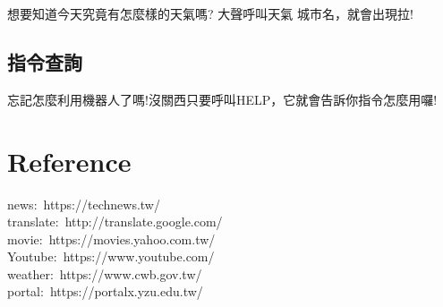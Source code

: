 \documentclass{scrreprt}
\begin{document}
\begin{CJK}{UTF8}{bkai}
想要知道今天究竟有怎麼樣的天氣嗎? 大聲呼叫{\color{red}天氣 城市名}，就會出現拉!

\section{指令查詢}

忘記怎麼利用機器人了嗎!沒關西只要呼叫{\color{red}HELP}，它就會告訴你指令怎麼用囉!

\chapter{Reference}

news$:$ {\color{blue}https://technews.tw/}\\
translate$:$ {\color{blue}http://translate.google.com/}\\
movie$:$ {\color{blue}https://movies.yahoo.com.tw/}\\
Youtube$:$ {\color{blue}https://www.youtube.com/}\\
weather$:$ {\color{blue}https://www.cwb.gov.tw/}\\
portal$:$ {\color{blue}https://portalx.yzu.edu.tw/}

\end{CJK}
\end{document}
